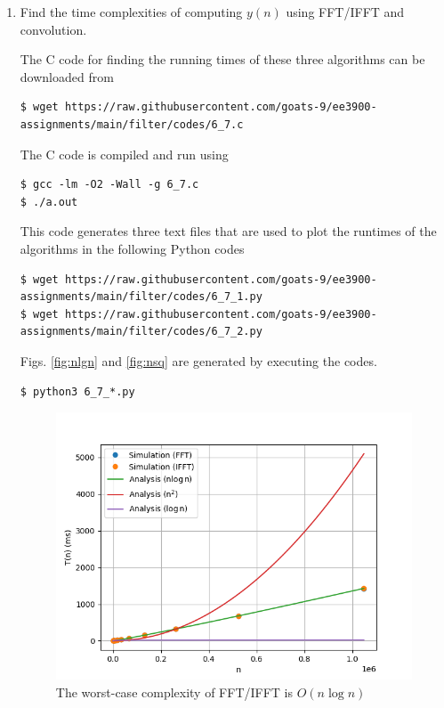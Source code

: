 \documentclass[journal,12pt,twocolumn]{IEEEtran}
\renewcommand\thesection{\arabic{section}}
\begin{document}
\begin{enumerate}[label=\thesection.\arabic*]
\item Find the time complexities of computing $y(n)$ using FFT/IFFT and convolution.

\solution The C code for finding the running times of these three algorithms can be downloaded from
\begin{lstlisting}
$ wget https://raw.githubusercontent.com/goats-9/ee3900-assignments/main/filter/codes/6_7.c
\end{lstlisting}
The C code is compiled and run using
\begin{lstlisting}
$ gcc -lm -O2 -Wall -g 6_7.c
$ ./a.out
\end{lstlisting}
This code generates three text files that are used to plot the runtimes of the algorithms in the following Python codes
\begin{lstlisting}
$ wget https://raw.githubusercontent.com/goats-9/ee3900-assignments/main/filter/codes/6_7_1.py
$ wget https://raw.githubusercontent.com/goats-9/ee3900-assignments/main/filter/codes/6_7_2.py
\end{lstlisting}
Figs. \eqref{fig:nlgn} and \eqref{fig:nsq} are generated by executing the codes.
\begin{lstlisting}
$ python3 6_7_*.py 
\end{lstlisting}

\begin{figure}[!htb]
	\includegraphics[width=\columnwidth]{figs/6_7_1.png}
	\caption{The worst-case complexity of FFT/IFFT is $O(n\log{n})$}
	\label{fig:nlgn}
\end{figure}


\end{enumerate}
\end{document}
